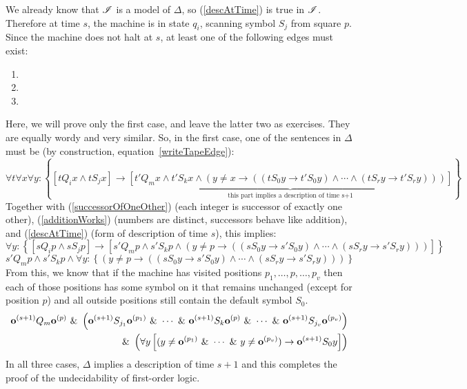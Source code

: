 We already know that $\mathscr{I}$ is a model of $\Delta$, so (\ref{descAtTime}) is true in $\mathscr{I}$. Therefore at time $s$, the machine is in state $q_i$, scanning symbol $S_j$ from square $p$. Since the machine does not halt at $s$, at least one of the following edges must exist:
\begin{enumerate}
\item {}
\item {}
\item {}
\end{enumerate}
Here, we will prove only the first case, and leave the latter two as exercises. They are equally wordy and very similar. So, in the first case, one of the sentences in $\Delta$ must be (by construction, equation~\ref{writeTapeEdge}):
$$\forall t\forall x\forall y: \left\{ \left[t Q_i x \land t S_j x\right] \to \underbrace{\left[t' Q_m x \land t' S_k x \land (y \neq x \to ((t S_0 y \to t' S_0 y) \land \cdots \land (t S_r y \to t' S_r y)))\right]}_{\text{this part implies a description of time s+1}} \right\}$$
Together with (\ref{successorOfOneOther}) (each integer is successor of exactly one other), (\ref{additionWorks}) (numbers are distinct, successors behave like addition), and (\ref{descAtTime}) (form of description of time $s$), this implies:
$$\forall y: \left\{ \left[s Q_i p \land s S_j p\right] \to \left[s' Q_m p \land s' S_k p \land (y \neq p \to ((s S_0 y \to s' S_0 y) \land \cdots \land (s S_r y \to s' S_r y)))\right] \right\}$$
$$s' Q_m p \land s' S_k p \land \forall y: \left\{ (y \neq p \to ((s S_0 y \to s' S_0 y) \land \cdots \land (s S_r y \to s' S_r y)))\right\}$$
From this, we know that if the machine has visited positions $p_1,\ldots,p,\ldots,p_v$ then each of those positions has some symbol on it that remains unchanged (except for position $p$) and all outside positions still contain the default symbol $S_0$.
\begin{equation}
\begin{split}
\mathbf{o}^{(s+1)} Q_m \mathbf{o}^{(p)} ~\&~ \left( \mathbf{o}^{(s+1)} S_{j_1} \mathbf{o}^{(p_1)} ~\&~ \cdots ~\&~ \mathbf{o}^{(s+1)} S_k \mathbf{o}^{(p)} ~\&~ \cdots ~\&~ \mathbf{o}^{(s+1)} S_{j_v} \mathbf{o}^{(p_v)}\right) \\
~\&~ \left(\forall y \left[ (y \neq \mathbf{o}^{(p_1)} ~\&~ \cdots ~\&~ y \neq \mathbf{o}^{(p_v)}) \to \mathbf{o}^{(s+1)} S_0 y \right]\right)
\end{split}
\end{equation}
In all three cases, $\Delta$ implies a description of time $s+1$ and this completes the proof of the undecidability of first-order logic.